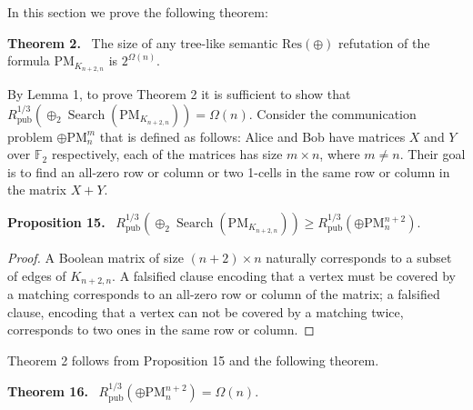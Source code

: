 \documentclass[10pt,a4paper]{article}
\newenvironment{authorclaim}[1]{\par\medskip\noindent\textbf{#1.}\ \ignorespaces}{\par\medskip}
\begin{document}
In this section we prove the following theorem:
\begin{authorclaim}{Theorem 2}
The size of any tree-like semantic $\mathrm{Res}(\oplus)$ refutation of the formula $\mathrm{PM}_{K_{n+2,n}}$ is $2^{\Omega(n)}$.

\end{authorclaim}
By Lemma 1, to prove Theorem 2 it is sufficient to show that $R^{1/3}_{\mathrm{pub}}(\oplus_2\operatorname{Search}(\mathrm{PM}_{K_{n+2,n}}))=\Omega(n)$.
Consider the communication problem $\oplus\mathrm{PM}_n^m$ that is defined as follows: Alice and Bob have matrices $X$ and $Y$ over $\mathbb F_2$ respectively, each of the matrices has size $m\times n$, where $m\ne n$. Their goal is to find an all-zero row or column or two 1-cells in the same row or column in the matrix $X+Y$.
\begin{authorclaim}{Proposition 15}
$R^{1/3}_{\mathrm{pub}}(\oplus_2\operatorname{Search}(\mathrm{PM}_{K_{n+2,n}}))\ge R^{1/3}_{\mathrm{pub}}(\oplus\mathrm{PM}_n^{n+2})$.
\end{authorclaim}
\begin{proof}
A Boolean matrix of size $(n+2)\times n$ naturally corresponds to a subset of edges of $K_{n+2,n}$. A falsified clause encoding that a vertex must be covered by a matching corresponds to an all-zero row or column of the matrix; a falsified clause, encoding that a vertex can not be covered by a matching twice, corresponds to two ones in the same row or column.
\end{proof}
Theorem 2 follows from Proposition 15 and the following theorem.
\begin{authorclaim}{Theorem 16}
$R^{1/3}_{\mathrm{pub}}(\oplus\mathrm{PM}_n^{n+2})=\Omega(n)$.
\end{authorclaim}
\end{document}
